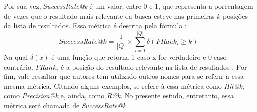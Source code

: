 Por sua vez, \textit{SuccessRate@k} é um valor, entre 0 e 1, que representa a porcentagem de vezes que o resultado mais relevante da busca esteve nas primeiras $k$ posições da lista de resultados. Essa métrica é descrita pela fórmula \cite{Wan2019MultimodalAN}:
\begin{equation*}
    SuccessRate@k=\frac{1}{|Q|} \times \sum_{i=1}^{|Q|} \delta(FRank_i \geq k)
\end{equation*}
Na qual $\delta(x)$ é uma função que retorna 1 caso x for verdadeiro e 0 caso contrário. $FRank_i$ é a posição do resultado relevante na lista de resultados \cite{Raghothaman2016SWIMSW}. Por fim, vale ressaltar que autores tem utilizado outros nomes para se referir à essa mesma métrica. Citando alguns exemplos, \textcite{Ling2020AdaptiveDC} se refere à essa métrica como \textit{Hit@k}, \textcite{Bui2021SelfSupervisedCL} como \textit{Precision@k} e, ainda, \textcite{Gu2021CRaDLeDC} como \textit{R@k}. No presente estudo, entretanto, essa métrica será chamada de \textit{SuccessRate@k}.

